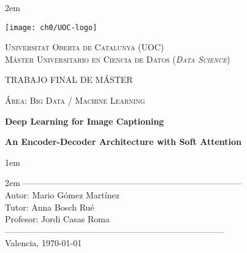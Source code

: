 \newpage
\thispagestyle{empty}

\baselineskip 2em


\centerline{\texttt{[image: ch0/UOC-logo]}}
\begin{center}
\textsc{Universitat Oberta de Catalunya (UOC) \\
 Máster Universitario en Ciencia de Datos (\textit{Data Science})\\}


\vspace*{1.5cm}

\textsc{\Large TRABAJO FINAL DE MÁSTER}

\vspace*{0.5cm}

\textsc{\large Área: Big Data / Machine Learning}



\vspace*{2.0cm}

\textbf{\Large Deep Learning for Image Captioning}

\textbf{\large An Encoder-Decoder Architecture with Soft Attention}

\vspace{2.5cm}
\baselineskip 1em

\baselineskip 2em
-----------------------------------------------------------------------------\\
Autor:      Mario Gómez Martínez\\
Tutor:      Anna Bosch Rué\\
Profesor:   Jordi Casas Roma\\
-----------------------------------------------------------------------------\\
\vspace*{1.5cm}
Valencia, \today

\end{center}

\newpage
\pagestyle{empty}
\hfill
